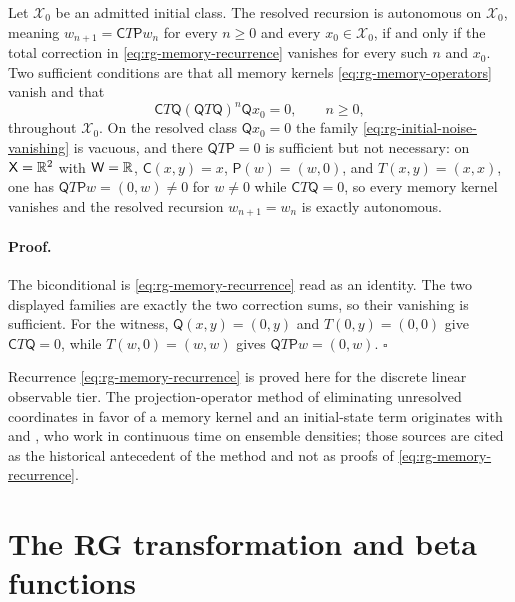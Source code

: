 Let $\mathcal X_0$ be an admitted initial class.  The resolved recursion is
autonomous on $\mathcal X_0$, meaning $w_{n+1}=\mathsf CT\mathsf Pw_n$ for every
$n\geq0$ and every $x_0\in\mathcal X_0$, if and only if the total correction in
\eqref{eq:rg-memory-recurrence} vanishes for every such $n$ and $x_0$.  Two
sufficient conditions are that all memory kernels
\eqref{eq:rg-memory-operators} vanish and that
\begin{equation}
\mathsf CT\mathsf Q(\mathsf QT\mathsf Q)^{n}\mathsf Qx_0=0,
\qquad n\geq0,
\label{eq:rg-initial-noise-vanishing}
\end{equation}
throughout $\mathcal X_0$.  On the resolved class $\mathsf Qx_0=0$ the family
\eqref{eq:rg-initial-noise-vanishing} is vacuous, and there
$\mathsf QT\mathsf P=0$ is sufficient but not necessary: on
$\mathsf X=\mathbb R^2$ with $\mathsf W=\mathbb R$, $\mathsf C(x,y)=x$,
$\mathsf P(w)=(w,0)$, and $T(x,y)=(x,x)$, one has
$\mathsf QT\mathsf Pw=(0,w)\neq0$ for $w\neq0$ while
$\mathsf CT\mathsf Q=0$, so every memory kernel vanishes and the resolved
recursion $w_{n+1}=w_n$ is exactly autonomous. 

\paragraph{Proof.}
The biconditional is \eqref{eq:rg-memory-recurrence} read as an identity.  The
two displayed families are exactly the two correction sums, so their vanishing
is sufficient.  For the witness, $\mathsf Q(x,y)=(0,y)$ and
$T(0,y)=(0,0)$ give $\mathsf CT\mathsf Q=0$, while
$T(w,0)=(w,w)$ gives $\mathsf QT\mathsf Pw=(0,w)$. $\square$

Recurrence \eqref{eq:rg-memory-recurrence} is proved here for the discrete
linear observable tier.  The projection-operator method of eliminating
unresolved coordinates in favor of a memory kernel and an initial-state term
originates with \citet{Nakajima1958} and \citet{Zwanzig1960}, who work in
continuous time on ensemble densities; those sources are cited as the historical
antecedent of the method and not as proofs of
\eqref{eq:rg-memory-recurrence}. 

\section{The RG transformation and beta functions}
\label{sec:rg-beta-function}

